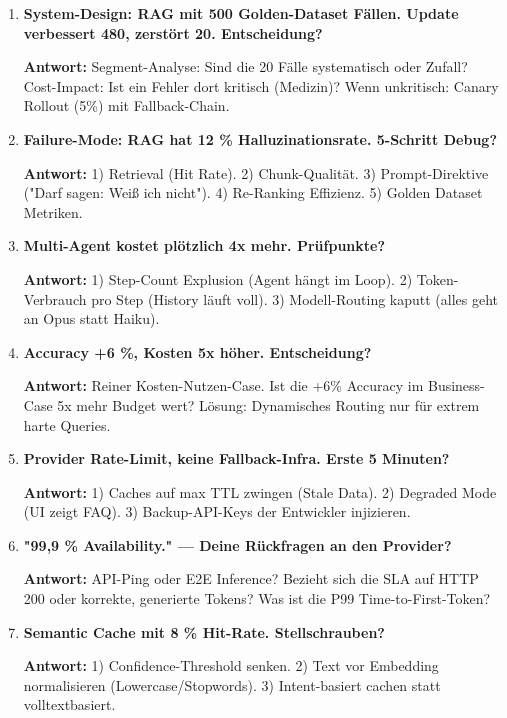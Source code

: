 \begin{enumerate}[leftmargin=*]
    \item \textbf{System-Design: RAG mit 500 Golden-Dataset Fällen. Update verbessert 480, zerstört 20. Entscheidung?}

    \textbf{Antwort:} Segment-Analyse: Sind die 20 Fälle systematisch oder Zufall? Cost-Impact: Ist ein Fehler dort kritisch (Medizin)? Wenn unkritisch: Canary Rollout (5\%) mit Fallback-Chain.

    \item \textbf{Failure-Mode: RAG hat 12 \% Halluzinationsrate. 5-Schritt Debug?}

    \textbf{Antwort:} 1) Retrieval (Hit Rate). 2) Chunk-Qualität. 3) Prompt-Direktive ("Darf sagen: Weiß ich nicht"). 4) Re-Ranking Effizienz. 5) Golden Dataset Metriken.

    \item \textbf{Multi-Agent kostet plötzlich 4x mehr. Prüfpunkte?}

    \textbf{Antwort:} 1) Step-Count Explusion (Agent hängt im Loop). 2) Token-Verbrauch pro Step (History läuft voll). 3) Modell-Routing kaputt (alles geht an Opus statt Haiku).

    \item \textbf{Accuracy +6 \%, Kosten 5x höher. Entscheidung?}

    \textbf{Antwort:} Reiner Kosten-Nutzen-Case. Ist die +6\% Accuracy im Business-Case 5x mehr Budget wert? Lösung: Dynamisches Routing nur für extrem harte Queries.

    \item \textbf{Provider Rate-Limit, keine Fallback-Infra. Erste 5 Minuten?}

    \textbf{Antwort:} 1) Caches auf max TTL zwingen (Stale Data). 2) Degraded Mode (UI zeigt FAQ). 3) Backup-API-Keys der Entwickler injizieren.

    \item \textbf{"99,9 \% Availability." — Deine Rückfragen an den Provider?}

    \textbf{Antwort:} API-Ping oder E2E Inference? Bezieht sich die SLA auf HTTP 200 oder korrekte, generierte Tokens? Was ist die P99 Time-to-First-Token?

    \item \textbf{Semantic Cache mit 8 \% Hit-Rate. Stellschrauben?}

    \textbf{Antwort:} 1) Confidence-Threshold senken. 2) Text vor Embedding normalisieren (Lowercase/Stopwords). 3) Intent-basiert cachen statt volltextbasiert.


\end{enumerate}
